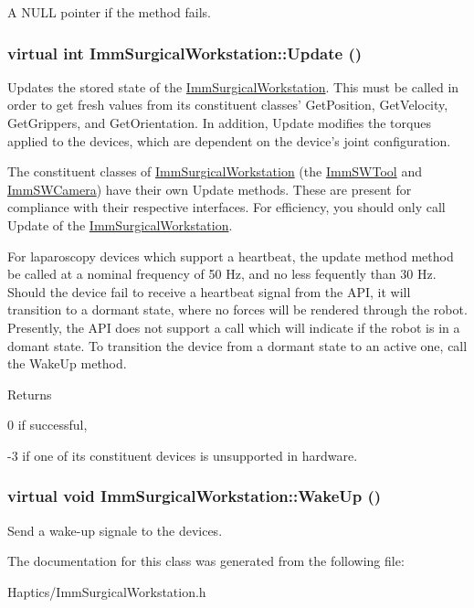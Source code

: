 A NULL pointer if the method fails. \hypertarget{classImmSurgicalWorkstation_af671066fe27efa7fae77c81cf81840de}{
\subsubsection[{Update}]{\setlength{\rightskip}{0pt plus 5cm}virtual int ImmSurgicalWorkstation::Update ()}}
\label{classImmSurgicalWorkstation_af671066fe27efa7fae77c81cf81840de}
Updates the stored state of the \hyperlink{classImmSurgicalWorkstation}{ImmSurgicalWorkstation}. This must be called in order to get fresh values from its constituent classes' GetPosition, GetVelocity, GetGrippers, and GetOrientation. In addition, Update modifies the torques applied to the devices, which are dependent on the device's joint configuration.

The constituent classes of \hyperlink{classImmSurgicalWorkstation}{ImmSurgicalWorkstation} (the \hyperlink{classImmSWTool}{ImmSWTool} and \hyperlink{classImmSWCamera}{ImmSWCamera}) have their own Update methods. These are present for compliance with their respective interfaces. For efficiency, you should only call Update of the \hyperlink{classImmSurgicalWorkstation}{ImmSurgicalWorkstation}.

For laparoscopy devices which support a heartbeat, the update method method be called at a nominal frequency of 50 Hz, and no less fequently than 30 Hz. Should the device fail to receive a heartbeat signal from the API, it will transition to a dormant state, where no forces will be rendered through the robot. Presently, the API does not support a call which will indicate if the robot is in a domant state. To transition the device from a dormant state to an active one, call the WakeUp method.

\begin{DoxyReturn}{Returns}

\end{DoxyReturn}
0 if successful,

-\/3 if one of its constituent devices is unsupported in hardware. \hypertarget{classImmSurgicalWorkstation_adec269aea68312831b26fedbbb376b42}{
\subsubsection[{WakeUp}]{\setlength{\rightskip}{0pt plus 5cm}virtual void ImmSurgicalWorkstation::WakeUp ()}}
\label{classImmSurgicalWorkstation_adec269aea68312831b26fedbbb376b42}
Send a wake-\/up signale to the devices. 

The documentation for this class was generated from the following file:\begin{DoxyCompactItemize}
\item 
Haptics/ImmSurgicalWorkstation.h\end{DoxyCompactItemize}
